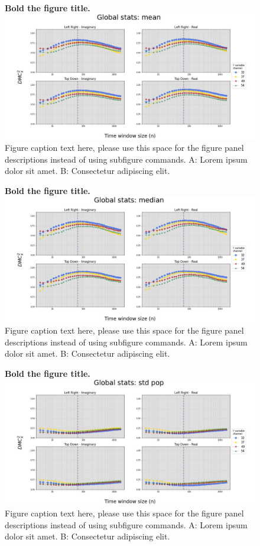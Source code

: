 \documentclass[10pt,letterpaper]{article}
\begin{document}
\begin{figure}[!h]
    \caption{{\bf Bold the figure title.}
    \includegraphics[width=.9\textwidth]{../output/figs/global/mean.jpg}
      Figure caption text here, please use this space for the figure panel descriptions instead of using subfigure commands. A: Lorem ipsum dolor sit amet. B: Consectetur adipiscing elit.}
      \label{glob_mean}
\end{figure}



\begin{figure}[!h]
    \caption{{\bf Bold the figure title.}
    \includegraphics[width=.9\textwidth]{../output/figs/global/median.jpg}
      Figure caption text here, please use this space for the figure panel descriptions instead of using subfigure commands. A: Lorem ipsum dolor sit amet. B: Consectetur adipiscing elit.}
    \label{glob_median}
\end{figure}

\begin{figure}[!h]
    \caption{{\bf Bold the figure title.}
    \includegraphics[width=.9\textwidth]{../output/figs/global/std pop.jpg}
    Figure caption text here, please use this space for the figure panel descriptions instead of using subfigure commands. A: Lorem ipsum dolor sit amet. B: Consectetur adipiscing elit.}
    \label{glob_std_pop}
\end{figure}
\end{document}
